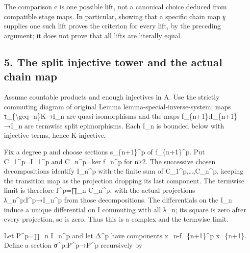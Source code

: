 \documentclass[11pt]{article}
\begin{document}
The comparison c is one possible lift,\allowbreak{} not a canonical choice deduced from compatible stage maps. In particular,\allowbreak{} showing that a specific chain map γ supplies one such lift proves the criterion for every lift,\allowbreak{} by the preceding argument; it does not prove that all lifts are literally equal.

\subsection{5. The split injective tower and the actual chain map}\label{proofs-10435-10686-the-split-injective-tower-and-the-actual-chain-map}

Assume countable products and enough injectives in A. Use the strictly commuting diagram of original Lemma lemma-special-inverse-system:\allowbreak{} maps τ\_\allowbreak{}\{\textbackslash{}geq -n\}K\allowbreak{}→I\_\allowbreak{}n are quasi-isomorphisms and the maps f\_\allowbreak{}\{n\allowbreak{}+1\}:\allowbreak{}I\_\allowbreak{}\{n\allowbreak{}+1\}\allowbreak{}→I\_\allowbreak{}n are termwise split epimorphisms. Each I\_\allowbreak{}n is bounded below with injective terms,\allowbreak{} hence K-injective.

Fix a degree p and choose sections s\_\allowbreak{}\{n\allowbreak{}+1\}\textasciicircum{}p of f\_\allowbreak{}\{n\allowbreak{}+1\}\textasciicircum{}p. Put C\_\allowbreak{}1\textasciicircum{}p\allowbreak{}=I\_\allowbreak{}1\textasciicircum{}p and C\_\allowbreak{}n\textasciicircum{}p\allowbreak{}=ker f\_\allowbreak{}n\textasciicircum{}p for n≥2. The successive chosen decompositions identify I\_\allowbreak{}n\textasciicircum{}p with the finite sum of C\_\allowbreak{}1\textasciicircum{}p,\allowbreak{}…,\allowbreak{}C\_\allowbreak{}n\textasciicircum{}p,\allowbreak{} keeping the transition map as the projection dropping its last component. The termwise limit is therefore I\textasciicircum{}p\allowbreak{}=∏\_\allowbreak{}n C\_\allowbreak{}n\textasciicircum{}p,\allowbreak{} with the actual projections λ\_\allowbreak{}n\textasciicircum{}p:\allowbreak{}I\textasciicircum{}p\allowbreak{}→I\_\allowbreak{}n\textasciicircum{}p from those decompositions. The differentials on the I\_\allowbreak{}n induce a unique differential on I commuting with all λ\_\allowbreak{}n; its square is zero after every projection,\allowbreak{} so is zero. Thus this is a complex and the termwise limit.

Let P\textasciicircum{}p\allowbreak{}=∏\_\allowbreak{}n I\_\allowbreak{}n\textasciicircum{}p and let Δ\^{}p have components x\_\allowbreak{}n-f\_\allowbreak{}\{n\allowbreak{}+1\}\textasciicircum{}p x\_\allowbreak{}\{n\allowbreak{}+1\}. Define a section σ\textasciicircum{}p:\allowbreak{}P\textasciicircum{}p\allowbreak{}→P\textasciicircum{}p recursively by
\end{document}
